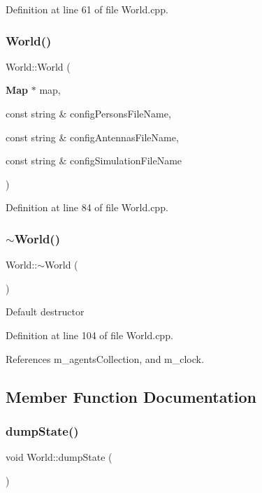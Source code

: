 Definition at line 61 of file World.\+cpp.

\mbox{\label{class_world_a6376bd8ac7c88b8e01e7cca06d9bb18a}} 
\subsubsection{World()\hspace{0.1cm}{\footnotesize\ttfamily [3/3]}}
{\footnotesize\ttfamily World\+::\+World (\begin{DoxyParamCaption}\item[{\textbf{ Map} $\ast$}]{map,  }\item[{const string \&}]{config\+Persons\+File\+Name,  }\item[{const string \&}]{config\+Antennas\+File\+Name,  }\item[{const string \&}]{config\+Simulation\+File\+Name }\end{DoxyParamCaption})\hspace{0.3cm}{\ttfamily [noexcept]}}



Definition at line 84 of file World.\+cpp.

\mbox{\label{class_world_a8c73fba541a5817fff65147ba47cd827}} 
\subsubsection{$\sim$World()}
{\footnotesize\ttfamily World\+::$\sim$\+World (\begin{DoxyParamCaption}{ }\end{DoxyParamCaption})\hspace{0.3cm}{\ttfamily [virtual]}}

Default destructor 

Definition at line 104 of file World.\+cpp.



References m\+\_\+agents\+Collection, and m\+\_\+clock.



\subsection{Member Function Documentation}
\mbox{\label{class_world_abb6faf5385d3960dca29ee9390460eea}} 
\subsubsection{dumpState()}
{\footnotesize\ttfamily void World\+::dump\+State (\begin{DoxyParamCaption}{ }\end{DoxyParamCaption})}

